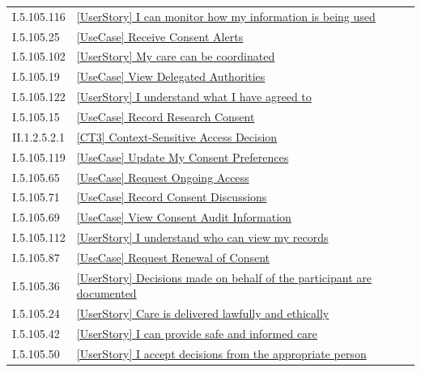 \begin{longtable}{p{.22\linewidth}p{.73\linewidth}}
I.5.105.116 & \hyperref[element:7d96ca2acd8c488485fa4f57d8ce7607]{[UserStory] I can monitor how my information is being used} \\
I.5.105.25 & \hyperref[element:7eaffaba77354ff086757b523ca88d7e]{[UseCase] Receive Consent Alerts} \\
I.5.105.102 & \hyperref[element:829605cb7a6b4a649b00cb401f7e444e]{[UserStory] My care can be coordinated} \\
I.5.105.19 & \hyperref[element:8363abf87fc046b6a451be3fa8b85297]{[UseCase] View Delegated Authorities} \\
I.5.105.122 & \hyperref[element:83952460f0ef4821be9f32e9d3523123]{[UserStory] I understand what I have agreed to} \\
I.5.105.15 & \hyperref[element:86dfa99d4e734cd49b160cfb963d1b02]{[UseCase] Record Research Consent} \\
II.1.2.5.2.1 & \hyperref[element:8719d8ed49f940cfbba2d26ae14ea54d]{[CT3] Context-Sensitive Access Decision} \\
I.5.105.119 & \hyperref[element:882fc520e3fe41448a311018f3eca0e2]{[UseCase] Update My Consent Preferences} \\
I.5.105.65 & \hyperref[element:88765b2418994e67b541f4fbde37d9da]{[UseCase] Request Ongoing Access} \\
I.5.105.71 & \hyperref[element:8b909efa823a410db4eebb47e5eac216]{[UseCase] Record Consent Discussions} \\
I.5.105.69 & \hyperref[element:8ba1069d695740e1b193af1d7f8c8960]{[UseCase] View Consent Audit Information} \\
I.5.105.112 & \hyperref[element:8bbf63063cd04651b2c74c9fc07e7a82]{[UserStory] I understand who can view my records} \\
I.5.105.87 & \hyperref[element:8c4dec5c5d5844e5abe31ff3d95750d5]{[UseCase] Request Renewal of Consent} \\
I.5.105.36 & \hyperref[element:8f33280ba961466cafe16b8525cef65e]{[UserStory] Decisions made on behalf of the participant are documented} \\
I.5.105.24 & \hyperref[element:8f4c42e582a14bf4b27772faa2eb0942]{[UserStory] Care is delivered lawfully and ethically} \\
I.5.105.42 & \hyperref[element:917e533e11bb4866830d8af2fafe1d27]{[UserStory] I can provide safe and informed care} \\
I.5.105.50 & \hyperref[element:9286a0cc02804ab0a359f639b3a6a078]{[UserStory] I accept decisions from the appropriate person} \\

\end{longtable}
